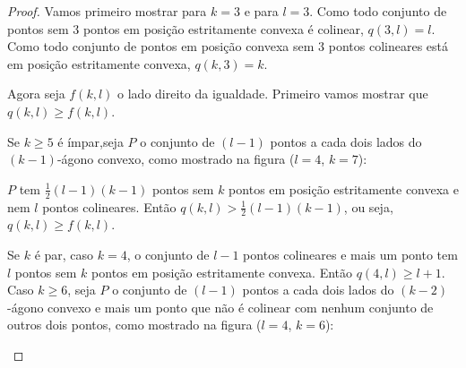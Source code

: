 \begin{proof}
    Vamos primeiro mostrar para $k=3$ e para $l=3$.
    Como todo conjunto de pontos sem $3$ pontos em posição estritamente convexa é colinear, $q(3,l) = l$.
    Como todo conjunto de pontos em posição convexa sem $3$ pontos colineares está em posição estritamente convexa, $q(k,3)=k$.

    Agora seja $f(k,l)$ o lado direito da igualdade. Primeiro vamos mostrar que $q(k,l)\geq f(k,l)$.

    Se $k\geq5$ é ímpar,seja $P$ o conjunto de $(l-1)$ pontos a cada dois lados do $(k-1)$-ágono convexo, como mostrado na figura ($l=4$, $k=7$):
    \begin{center}
    \end{center}
   
    $P$ tem $\frac{1}{2}(l-1)(k-1)$ pontos sem $k$ pontos em posição estritamente convexa e nem $l$ pontos colineares. Então $q(k,l)>\frac{1}{2}(l-1)(k-1)$, ou seja, $q(k,l)\geq f(k,l)$.

    Se $k$ é par, caso $k=4$, o conjunto de $l-1$ pontos colineares e mais um ponto tem $l$ pontos sem $k$ pontos em posição estritamente convexa. Então $q(4,l)\geq l+1$.
    Caso $k\geq 6$, seja $P$ o conjunto de $(l-1)$ pontos a cada dois lados do $(k-2)$-ágono convexo e mais um ponto que não é colinear com nenhum conjunto de outros dois pontos, como mostrado na figura ($l=4$, $k=6$):
    \begin{center}
\end{center}
\end{proof}
